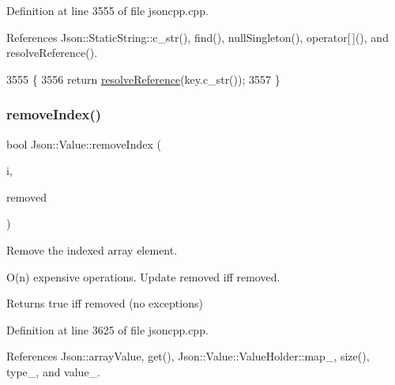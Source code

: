 Definition at line 3555 of file jsoncpp.\+cpp.



References Json\+::\+Static\+String\+::c\+\_\+str(), find(), null\+Singleton(), operator\mbox{[}$\,$\mbox{]}(), and resolve\+Reference().


\begin{DoxyCode}
3555                                                 \{
3556   \textcolor{keywordflow}{return} \hyperlink{class_json_1_1_value_a9ff9cdae2c8f4155bab603d750b0b3f1}{resolveReference}(key.c\_str());
3557 \}
\end{DoxyCode}
\mbox{\label{class_json_1_1_value_ae9e67e08a85a2f3be3396ec0f4c47f65}} 
\subsubsection{\texorpdfstring{remove\+Index()}{removeIndex()}}
{\footnotesize\ttfamily bool Json\+::\+Value\+::remove\+Index (\begin{DoxyParamCaption}\item[{\hyperlink{class_json_1_1_value_a184a91566cccca7b819240f0d5561c7d}{Array\+Index}}]{i,  }\item[{\hyperlink{class_json_1_1_value}{Value} $\ast$}]{removed }\end{DoxyParamCaption})}



Remove the indexed array element. 

O(n) expensive operations. Update \textquotesingle{}removed\textquotesingle{} iff removed. \begin{DoxyReturn}{Returns}
true iff removed (no exceptions) 
\end{DoxyReturn}


Definition at line 3625 of file jsoncpp.\+cpp.



References Json\+::array\+Value, get(), Json\+::\+Value\+::\+Value\+Holder\+::map\+\_\+, size(), type\+\_\+, and value\+\_\+.


